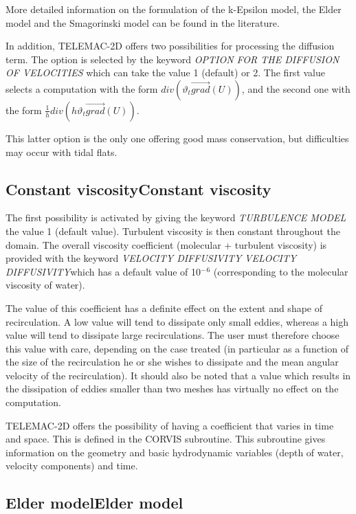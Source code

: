  More detailed information on the formulation of the k-Epsilon model, the Elder model and the Smagorinski model can be found in the literature.

 In addition, TELEMAC-2D offers two possibilities for processing the diffusion term. The option is selected by the keyword \textit{OPTION FOR THE DIFFUSION OF VELOCITIES} which can take the value 1 (default) or 2. The first value selects a computation with the form $div\left({\vartheta }_t\overrightarrow{grad}\left(U\right)\right)$, and the second one with the form $\frac{1}{h}div\left({h\vartheta }_t\overrightarrow{grad}\left(U\right)\right)$.

 This latter option is the only one offering good mass conservation, but difficulties may occur with tidal flats.


\subsection{ Constant viscosityConstant viscosity}

 The first possibility is activated by giving the keyword  \textit{TURBULENCE MODEL} the value 1 (default value). Turbulent viscosity is then constant throughout the domain. The overall viscosity coefficient (molecular + turbulent viscosity) is provided with the keyword \textit{VELOCITY DIFFUSIVITY} \textit{VELOCITY DIFFUSIVITY}which has a default value of 10${}^{-}$${}^{6}$ (corresponding to the molecular viscosity of water).

 The value of this coefficient has a definite effect on the extent and shape of recirculation. A low value will tend to dissipate only small eddies, whereas a high value will tend to dissipate large recirculations. The user must therefore choose this value with care, depending on the case treated (in particular as a function of the size of the recirculation he or she wishes to dissipate and the mean angular velocity of the recirculation). It should also be noted that a value which results in the dissipation of eddies smaller than two meshes has virtually no effect on the computation.

 TELEMAC-2D offers the possibility of having a coefficient that varies in time and space. This is defined in the CORVIS subroutine. This subroutine gives information on the geometry and basic hydrodynamic variables (depth of water, velocity components) and time.


\subsection{ Elder modelElder model}

